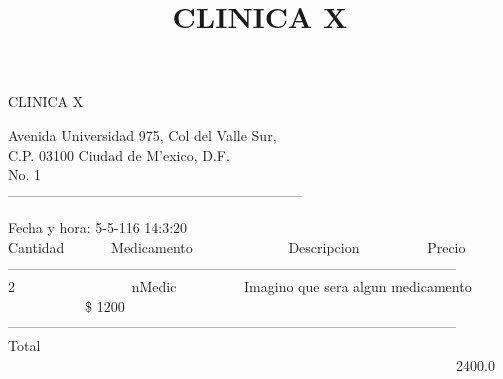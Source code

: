 \documentclass[10pt,a4paper]{letter}
\title{\bf CLINICA X}
\begin{document}
\begin{center}
{\scshape\LARGE CLINICA X\par}
{Avenida Universidad 975, Col del Valle Sur,\\}
{C.P. 03100 Ciudad de M'exico, D.F.}\\ 
{No. 1}\\ 
---------------------------------------------------------------
\end{center}

Fecha y hora: 5-5-116 14:3:20\\

Cantidad \ \ \ \ \ \ Medicamento \ \ \ \ \ \ \ \ \ \ \ \ \  Descripcion  \ \ \ \ \ \ \ \ \ Precio \\
------------------------------------------------------------------------------------------------ \\
2 \ \ \ \ \ \ \ \ \ \ \ \ \ \ \ \ nMedic \ \ \ \ \ \ \ \ \ Imagino que sera algun medicamento \ \ \ \ \ \ \ \ \ \ \ \$ 1200 \\

------------------------------------------------------------------------------------------------ \\
Total	\ \ \ \ \ \ \ \ \ \ \ \ \  \ \ \ \ \ \ \ \ \ \ \ \ \ \ \ \ \ \ \ \ \ \ \ \ \ \ \ \ \ \ \ \ \ \ \ \ \ \ \ \ \  \ \ \ \ \ \ \ \ \ \ 2400.0 \\
 
\end{document}
